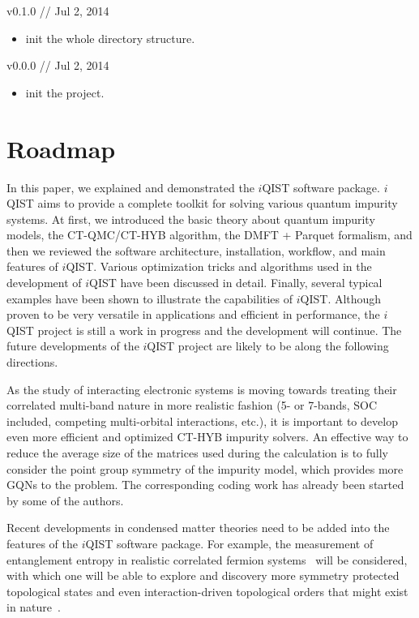 v0.1.0 // Jul 2, 2014

\begin{itemize}
\item init the whole directory structure.
\end{itemize}


v0.0.0 // Jul 2, 2014

\begin{itemize}
\item init the project.
\end{itemize}

\section{Roadmap}

In this paper, we explained and demonstrated the $i$QIST software package. $i$QIST aims to provide a complete toolkit for solving various quantum impurity systems. At first, we introduced the basic theory about quantum impurity models, the CT-QMC/CT-HYB algorithm, the DMFT + Parquet formalism, and then we reviewed the software architecture, installation, workflow, and main features of $i$QIST. Various optimization tricks and algorithms used in the development of $i$QIST have been discussed in detail. Finally, several typical examples have been shown to illustrate the capabilities of $i$QIST. Although proven to be very versatile in applications and efficient in performance, the $i$QIST project is still a work in progress and the development will continue. The future developments of the $i$QIST project are likely to be along the following directions.

As the study of interacting electronic systems is moving towards treating their correlated multi-band nature in more realistic fashion (5- or 7-bands, SOC included, competing multi-orbital interactions, etc.), it is important to develop even more efficient and optimized CT-HYB impurity solvers. An effective way to reduce the average size of the matrices used during the calculation is to fully consider the point group symmetry of the impurity model, which provides more GQNs to the problem. The corresponding coding work has already been started by some of the authors.

Recent developments in condensed matter theories need to be added into the features of the $i$QIST software package. For example, the measurement of entanglement entropy in realistic correlated fermion systems~\cite{PhysRevLett.111.130402,PhysRevB.89.125121} will be considered, with which one will be able to explore and discovery more symmetry protected topological states and even interaction-driven topological orders that might exist in nature~\cite{Chen21122012,Wang07022014}. 

